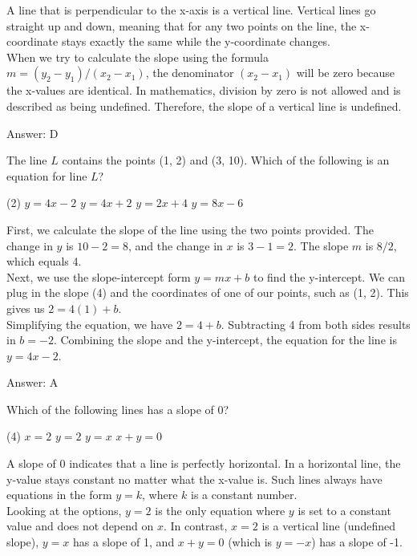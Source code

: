 \documentclass[11pt,paper=a4,answers]{exam}
\begin{document}
\begin{questions}
\begin{solution}
A line that is perpendicular to the x-axis is a vertical line. Vertical lines go straight up and down, meaning that for any two points on the line, the x-coordinate stays exactly the same while the y-coordinate changes.
\\[10pt]
When we try to calculate the slope using the formula $m = (y_2 - y_1) / (x_2 - x_1)$, the denominator $(x_2 - x_1)$ will be zero because the x-values are identical. In mathematics, division by zero is not allowed and is described as being undefined. Therefore, the slope of a vertical line is undefined.

\vspace{15pt}
Answer: \colorbox{yellow!100}{D}
\end{solution}

\question
The line $L$ contains the points (1, 2) and (3, 10). Which of the following is an equation for line $L$?
\begin{tasks}(2)
    \task $y = 4x - 2$
    \task $y = 4x + 2$
    \task $y = 2x + 4$
    \task $y = 8x - 6$
\end{tasks}

\begin{solution}
First, we calculate the slope of the line using the two points provided. The change in $y$ is $10 - 2 = 8$, and the change in $x$ is $3 - 1 = 2$. The slope $m$ is $8 / 2$, which equals 4.
\\[10pt]
Next, we use the slope-intercept form $y = mx + b$ to find the y-intercept. We can plug in the slope (4) and the coordinates of one of our points, such as (1, 2). This gives us $2 = 4(1) + b$.
\\[10pt]
Simplifying the equation, we have $2 = 4 + b$. Subtracting 4 from both sides results in $b = -2$. Combining the slope and the y-intercept, the equation for the line is $y = 4x - 2$.

\vspace{15pt}
Answer: \colorbox{yellow!100}{A}
\end{solution}

\question
Which of the following lines has a slope of 0?
\begin{tasks}(4)
    \task $x = 2$
    \task $y = 2$
    \task $y = x$
    \task $x + y = 0$
\end{tasks}

\begin{solution}
A slope of 0 indicates that a line is perfectly horizontal. In a horizontal line, the y-value stays constant no matter what the x-value is. Such lines always have equations in the form $y = k$, where $k$ is a constant number.
\\[10pt]
Looking at the options, $y = 2$ is the only equation where $y$ is set to a constant value and does not depend on $x$. In contrast, $x = 2$ is a vertical line (undefined slope), $y = x$ has a slope of 1, and $x + y = 0$ (which is $y = -x$) has a slope of -1.


\end{solution}
\end{questions}
\end{document}
